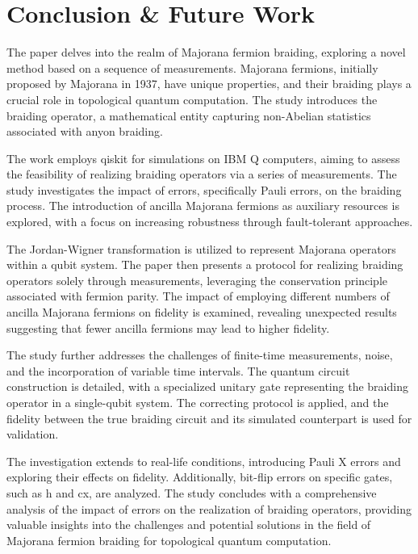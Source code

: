 \documentclass{article}
\begin{document}
\newpage
\section{Conclusion \& Future Work} %
\label{sec:Conclusion & Future Work}
The paper delves into the realm of Majorana fermion braiding, exploring a novel method based on a sequence of measurements. Majorana fermions, initially proposed by Majorana in 1937, have unique properties, and their braiding plays a crucial role in topological quantum computation. The study introduces the braiding operator, a mathematical entity capturing non-Abelian statistics associated with anyon braiding.

The work employs qiskit for simulations on IBM Q computers, aiming to assess the feasibility of realizing braiding operators via a series of measurements. The study investigates the impact of errors, specifically Pauli errors, on the braiding process. The introduction of ancilla Majorana fermions as auxiliary resources is explored, with a focus on increasing robustness through fault-tolerant approaches.

The Jordan-Wigner transformation is utilized to represent Majorana operators within a qubit system. The paper then presents a protocol for realizing braiding operators solely through measurements, leveraging the conservation principle associated with fermion parity. The impact of employing different numbers of ancilla Majorana fermions on fidelity is examined, revealing unexpected results suggesting that fewer ancilla fermions may lead to higher fidelity.

The study further addresses the challenges of finite-time measurements, noise, and the incorporation of variable time intervals. The quantum circuit construction is detailed, with a specialized unitary gate representing the braiding operator in a single-qubit system. The correcting protocol is applied, and the fidelity between the true braiding circuit and its simulated counterpart is used for validation.

The investigation extends to real-life conditions, introducing Pauli X errors and exploring their effects on fidelity. Additionally, bit-flip errors on specific gates, such as h and cx, are analyzed. The study concludes with a comprehensive analysis of the impact of errors on the realization of braiding operators, providing valuable insights into the challenges and potential solutions in the field of Majorana fermion braiding for topological quantum computation.
\end{document}
